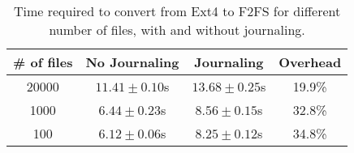 \begin{table}
\begin{center}
\begin{small}
\begin{tabular}{|c||c|c|c|}
\hline 
\# of files & No Journaling & Journaling & Overhead \\
\hline
\hline 
20000 & $11.41 \pm 0.10$s & $13.68 \pm 0.25$s & 19.9\% \\
\hline 
1000 & $6.44 \pm 0.23$s & $8.56 \pm 0.15$s & 32.8\% \\
\hline
100 & $6.12 \pm 0.06$s & $8.25 \pm 0.12$s & 34.8\% \\
\hline 
\end{tabular}
\end{small}
\end{center}
\vspace{-15pt}
\caption{\label{tab:fsconvert-result}Time required to convert 
from Ext4 to F2FS for different number of files, with and without journaling.}
\vspace{-5pt}
\end{table}


